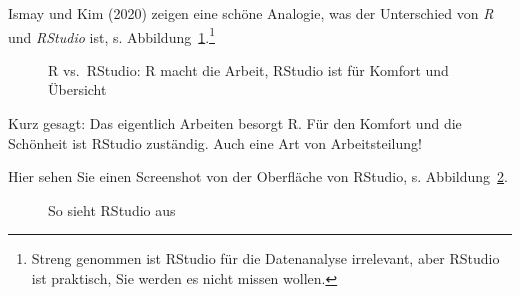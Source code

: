\documentclass[
  a4paper,
  DIV=11]{scrreprt}
\theoremstyle{definition}
\theoremstyle{definition}
\theoremstyle{definition}
\theoremstyle{remark}
\begin{document}
Ismay und Kim (2020) zeigen eine schöne Analogie, was der Unterschied
von \emph{R} und \emph{RStudio} ist, s.
Abbildung~\ref{fig-r-rstudio}.\footnote{Streng genommen ist RStudio für
  die Datenanalyse irrelevant, aber RStudio ist praktisch, Sie werden es
  nicht missen wollen.}

\begin{figure}


\caption{\label{fig-r-rstudio}R vs.~RStudio: R macht die Arbeit, RStudio
ist für Komfort und Übersicht}

\end{figure}%

Kurz gesagt: Das eigentlich Arbeiten besorgt R. Für den Komfort und die
Schönheit ist RStudio zuständig. Auch eine Art von Arbeitsteilung!

Hier sehen Sie einen Screenshot von der Oberfläche von RStudio, s.
Abbildung~\ref{fig-rstudio}.

\begin{figure}


\caption{\label{fig-rstudio}So sieht RStudio aus}

\end{figure}%
\end{document}
